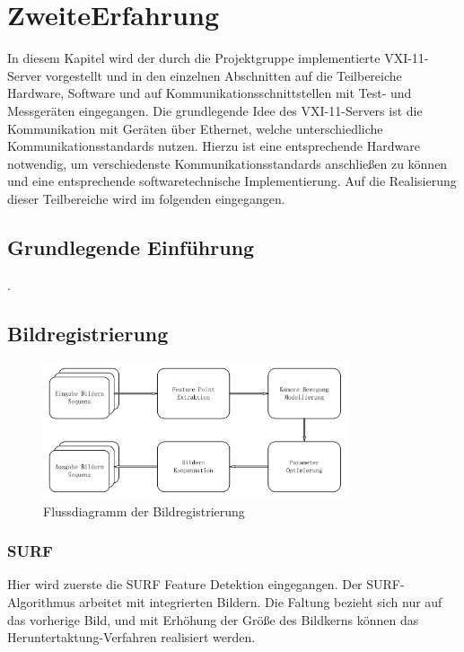 \chapter{ZweiteErfahrung} \label{cha:ZweiteErfahrung}

In diesem Kapitel wird der durch die Projektgruppe implementierte VXI-11-Server vorgestellt und in den einzelnen Abschnitten auf die Teilbereiche Hardware, Software und auf Kommunikationsschnittstellen mit Test- und Messgeräten eingegangen. Die grundlegende Idee des VXI-11-Servers ist die Kommunikation mit Geräten über Ethernet, welche unterschiedliche Kommunikationsstandards nutzen. Hierzu ist eine entsprechende Hardware notwendig, um verschiedenste Kommunikationsstandards anschließen zu können und eine entsprechende softwaretechnische Implementierung. Auf die Realisierung dieser Teilbereiche wird im folgenden eingegangen.

\section{Grundlegende Einführung} 
\cite{lin1973}.

\section{Bildregistrierung} 

\begin{figure}[htb]
 \centering 
 \includegraphics[keepaspectratio,width=0.8\textwidth]{images/0_Image_Registration_Flussdiagramm.pdf}
 \caption{Flussdiagramm der Bildregistrierung}
 \label{fig:Bildregistrierung}
\end{figure}

\subsection{SURF}
Hier wird zuerste die SURF\cite{Surf} Feature Detektion eingegangen. Der SURF-Algorithmus arbeitet mit integrierten Bildern. Die Faltung bezieht sich nur auf das vorherige Bild, und mit Erhöhung der Größe des Bildkerns können das Heruntertaktung-Verfahren realisiert werden. 


